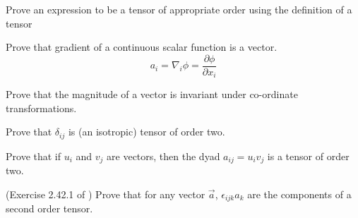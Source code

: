 
\begin{lo2}
Prove an expression to be a tensor of appropriate order using the definition of a tensor
\end{lo2}


\begin{question}
Prove that gradient of a continuous scalar function is a vector. 
\begin{equation}
a_i = \nabla_i\phi = \frac{\partial \phi}{\partial x_i}
\end{equation} 
\end{question}
\begin{solution}[print]
\end{solution}


\begin{question}
Prove that the magnitude of a vector is invariant under co-ordinate transformations.
\end{question}
\begin{solution}[print]
\end{solution}


\begin{question}
Prove that $\delta_{ij}$ is (an isotropic) tensor of order two.
\end{question}
\begin{solution}[print]
\end{solution}


\begin{question}
Prove that if $u_i$ and $v_j$ are vectors, then the dyad $a_{ij} = u_i v_j$ is a tensor of order two.
\end{question}
\begin{solution}[print]
\end{solution}


\begin{question}
(Exercise 2.42.1 of \cite{aris}) Prove that for any vector $\vec{a}$, $\epsilon_{ijk}a_k$ are the components of a second order tensor.
\end{question}
\begin{solution}[print]
\end{solution}

